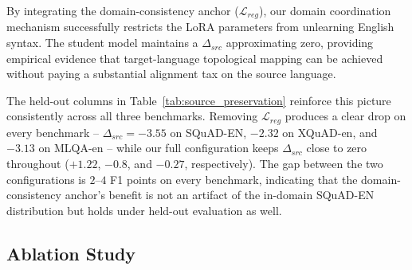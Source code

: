 \documentclass[11pt]{article}
\begin{document}
By integrating the domain-consistency anchor ($\mathcal{L}_{reg}$), our domain coordination mechanism successfully restricts the LoRA parameters from unlearning English syntax. The student model maintains a $\Delta_{src}$ approximating zero, providing empirical evidence that target-language topological mapping can be achieved without paying a substantial alignment tax on the source language.

The held-out columns in Table~\ref{tab:source_preservation} reinforce this picture consistently across all three benchmarks. Removing $\mathcal{L}_{reg}$ produces a clear drop on every benchmark -- $\Delta_{src}=-3.55$ on SQuAD-EN, $-2.32$ on XQuAD-en, and $-3.13$ on MLQA-en -- while our full configuration keeps $\Delta_{src}$ close to zero throughout ($+1.22$, $-0.8$, and $-0.27$, respectively). The gap between the two configurations is $2$--$4$ F1 points on every benchmark, indicating that the domain-consistency anchor's benefit is not an artifact of the in-domain SQuAD-EN distribution but holds under held-out evaluation as well.

\subsection{Ablation Study}
\label{sec:ablation_study}
\end{document}
